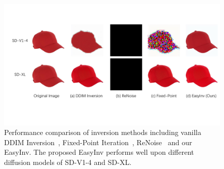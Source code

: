 \documentclass[letterpaper]{article} %
\begin{document}
\begin{figure}
  \centering
  \includegraphics[width=0.98\linewidth]{visual_hat_result_together_cut.pdf}
  \caption{Performance comparison of inversion methods including vanilla DDIM Inversion~\cite{couairon2023diffedit}, Fixed-Point Iteration~\cite{pan2023effective}, ReNoise~\cite{garibi2024renoise} and our EasyInv. The proposed EasyInv performs well upon different diffusion models of SD-V1-4 and SD-XL.}
  \label{fig_inver}
\end{figure}
\end{document}
